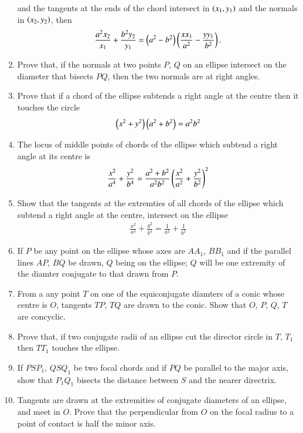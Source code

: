 \begin{enumerate}[1.]
and the tangents at the ends of the chord intersect in $\left(x_1,y_1\right)$ and the normals
in $\left(x_2,y_2\right)$, then
\begin{align*}
\frac{a^2x_2}{x_1}+\frac{b^2y_2}{y_1}=\left(a^2-b^2\right)\left(\frac{xx_1}{a^2}-\frac{yy_1}{b^2}\right).
\end{align*}
\item Prove that, if the normals at two points $P$, $Q$ on an ellipse intersect on the diameter
that bisects $PQ$, then the two normals are at right angles.
\item Prove that if a chord of the ellipse subtends a right angle at the centre
then it touches the circle
\begin{align*}
\left(x^2+y^2\right)\left(a^2+b^2\right) = a^2b^2
\end{align*}
\item The locus of middle points of chords of the ellipse which subtend a right angle at its centre is
\begin{align*}
\frac{x^2}{a^4}+\frac{y^2}{b^4}=\frac{a^2+b^2}{a^2b^2}\left(\frac{x^2}{a^2}+\frac{y^2}{b^2}\right)^2
\end{align*}
\item Show that the tangents at the extremties of all chords of the
ellipse which subtend a right angle at the centre, intersect on the ellipse
\begin{align*}
\frac{x^2}{a^4}+\frac{y^2}{b^4}=\frac{1}{a^2}+\frac{1}{b^2}
\end{align*}
\item If $P$ be any point on the ellipse whose axes are $AA_1$, $BB_1$ and if the parallel lines
$AP$, $BQ$ be drawn, $Q$ being on the ellipse; $Q$ will be one
extremity of the diamter conjugate to that drawn from $P$.
\item From a any point $T$ on one of the equiconjugate diamters of a conic whose centre is $O$, tangents $TP$, $TQ$ are drawn to 
the conic.  Show that $O$, $P$, $Q$, $T$ are concyclic.
\item Prove that, if two conjugate radii of an ellipse cut the
director circle in $T$, $T_1$ then $TT_1$ touches the ellipse.
\item If $PSP_1$, $QSQ_1$ be two focal chords and if $PQ$ be parallel to the major axis, show that $P_1Q_1$ bisects the distance
between $S$ and the nearer directrix.
\item Tangents are drawn at the extremities of conjugate diameters of an ellipse, and meet in $O$.  Prove that the
perpendicular from $O$ on the focal radius to a point of contact is half the
minor axis.

\end{enumerate}
